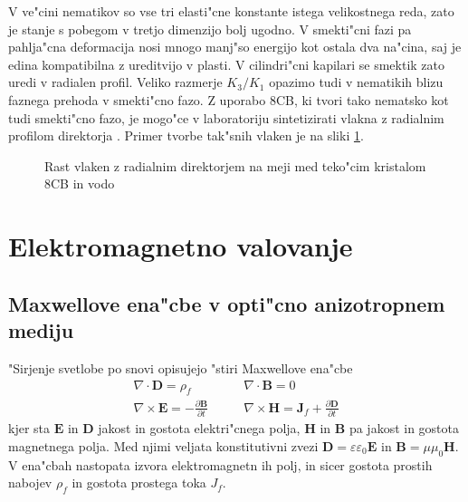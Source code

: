 \documentclass[12pt,twoside,openright,final,a4paper]{report}
\newcommand{\odvod}[2]{\frac{\partial #1}{\partial #2}}
\renewcommand{\vec}{\mathbf}
\begin{document}
V ve"cini nematikov so vse tri elasti"cne konstante istega velikostnega reda, zato je stanje s pobegom v tretjo dimenzijo bolj ugodno. 
V smekti"cni fazi pa pahlja"cna deformacija nosi mnogo manj"so energijo kot ostala dva na"cina, saj je edina kompatibilna z ureditvijo v plasti. 
V cilindri"cni kapilari se smektik zato uredi v radialen profil. 
Veliko razmerje $K_3/K_1$ opazimo tudi v nematikih blizu faznega prehoda v smekti"cno fazo. 
Z uporabo 8CB, ki tvori tako nematsko kot tudi smekti"cno fazo, je mogo"ce v laboratoriju sintetizirati vlakna z radialnim profilom direktorja \cite{peddireddy}. 
Primer tvorbe tak"snih vlaken je na sliki \ref{fig:tvorjenje}. 

\begin{figure}[!ht]
 \centering
 \caption{Rast vlaken z radialnim direktorjem na meji med teko"cim kristalom 8CB in vodo \cite{peddireddy}}
 \label{fig:tvorjenje}
\end{figure}

\chapter{Elektromagnetno valovanje}

\section{Maxwellove ena"cbe v opti"cno anizotropnem mediju}
"Sirjenje svetlobe po snovi opisujejo "stiri Maxwellove ena"cbe \cite{taflove}
\begin{equation}
\begin{aligned}
 \nabla \cdot \vec D = \rho_f & \qquad \nabla \cdot \vec B = 0 \\
 \nabla \times \vec E = -\odvod{\vec B}{t} & \qquad \nabla \times \vec H = \vec J_f + \odvod{\vec D}{t}
\end{aligned} 
\end{equation}
kjer sta $\vec E$ in $\vec D$ jakost in gostota elektri"cnega polja, $\vec H$ in $\vec B$ pa jakost in gostota magnetnega polja. 
Med njimi veljata konstitutivni zvezi $\vec D = \varepsilon \varepsilon_0 \vec E$ in $\vec B = \mu \mu_0 \vec H$. 
V ena"cbah nastopata izvora elektromagnetn	ih polj, in sicer gostota prostih nabojev $\rho_f$ in gostota prostega toka $J_f$. 
\end{document}
